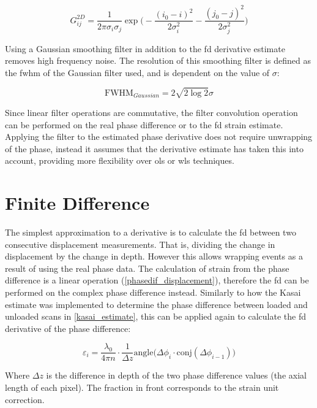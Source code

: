 \begin{equation}
	\label{gauss_2d}
	G^{2D}_{ij} = \frac{1}{2\pi \sigma_i \sigma_j } \exp{ 
	\bigg( - \frac{(i_0 - i)^2}{2 \sigma_i^2} - \frac{(j_0 - j)^2}{2 \sigma_j^2} \bigg)}
\end{equation}

Using a Gaussian smoothing filter in addition to the \ac{fd} derivative estimate removes high frequency noise. The resolution of this smoothing filter is defined as the \ac{fwhm} of the Gaussian filter used, and is dependent on the value of $\sigma$:

\begin{equation}
	\label{gauss_fwhm}
	\text{FWHM}_{Gaussian} = 2 \sqrt{2 \log{2}} \sigma
\end{equation}

Since linear filter operations are commutative, the filter convolution operation can be performed on the real phase difference or to the \ac{fd} strain estimate. Applying the filter to the estimated phase derivative does not require unwrapping of the phase, instead it assumes that the derivative estimate has taken this into account, providing more flexibility over \ac{ols} or \ac{wls} techniques.

\section{Finite Difference}\label{fd}

The simplest approximation to a derivative is to calculate the \ac{fd} between two consecutive displacement measurements. That is, dividing the change in displacement by the change in depth. However this allows wrapping events as a result of using the real phase data. The calculation of strain from the phase difference is a linear operation (\autoref{phasedif_displacement}), therefore the \ac{fd} can be performed on the complex phase difference instead. Similarly to how the Kasai estimate was implemented to determine the phase difference between loaded and unloaded scans in \autoref{kasai_estimate}, this can be applied again to calculate the \ac{fd} derivative of the phase difference:

\begin{equation}
	\varepsilon_i = \frac{\lambda_0}{4\pi n} \cdot \frac{1}{\Delta z} \text{angle}\bigg( \Delta \phi_i \cdot \text{conj}(\Delta \phi_{i-1}) \bigg)
	\label{fd_strain}
\end{equation}

Where $\Delta z$ is the difference in depth of the two phase difference values (the axial length of each pixel). The fraction in front corresponds to the strain unit correction.

